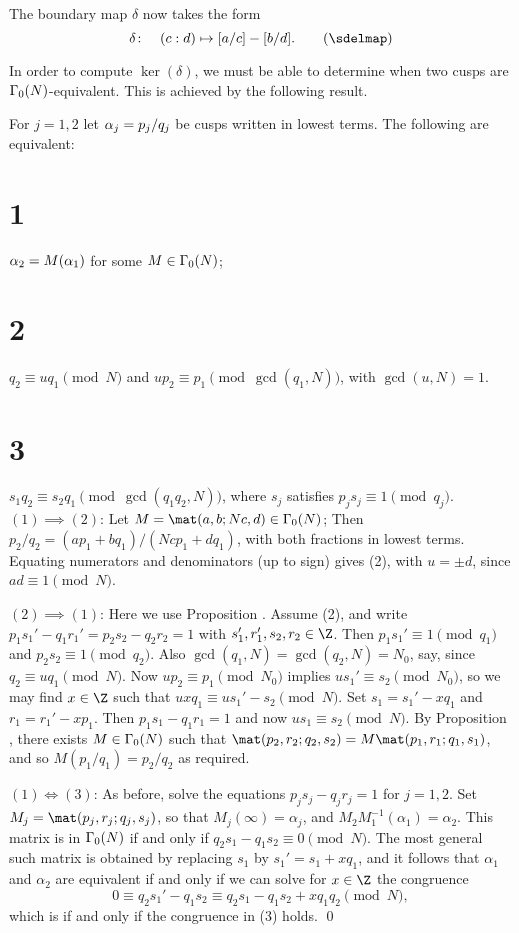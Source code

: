The boundary map $\delta$ now takes the form \neweq{\sdelmap}
$$
   \delta\colon\quad (c:d) \mapsto [a/c] - [b/d].          \tag \sdelmap
$$

In order to compute $\ker(\delta)$, we must be able to determine when two cusps
are $\G0(N)$-equivalent.  This is achieved by the following result.

\newprop{\Cuspeq}\def\a{\alpha}
For $j=1,2$ let $\a_j=p_j/q_j$ be cusps written in 
lowest terms.  The following are equivalent:
\part{1} $\a_2=M(\a_1)$ for some $M\in\G0(N)$;
\part{2} $q_2\equiv u q_1\pmod{N}$ and $up_2\equiv p_1\pmod{\gcd(q_1,N)}$, 
with $\gcd(u,N)=1$.
\part{3} $s_1q_2\equiv s_2q_1 \pmod{\gcd(q_1q_2,N)}$, where $s_j$ satisfies 
$p_js_j\equiv1\pmod{q_j}$.
\endproclaim
{} $(1) \implies (2)$:
Let $M=\mat(a,b;Nc,d)\in\G0(N)$;   Then $p_2/q_2=(ap_1+bq_1)/(Ncp_1+dq_1)$,
with both fractions in lowest terms.  Equating numerators and denominators 
(up to sign) gives (2), with $u=\pm d$, since $ad\equiv1\pmod{N}$.

$(2) \implies (1)$:
Here we use Proposition \Cosets.   Assume (2), and write 
$p_1s_1'-q_1r_1'=p_2s_2-q_2r_2=1$ with $s_1',r_1',s_2,r_2\in\Z$.
Then $p_1s_1'\equiv1\pmod{q_1}$ and $p_2s_2\equiv1\pmod{q_2}$.  Also
$\gcd(q_1,N)=\gcd(q_2,N)=N_0$, say, since $q_2\equiv u q_1\pmod{N}$.   
Now $up_2\equiv p_1\pmod{N_0}$ implies $us_1'\equiv s_2\pmod{N_0}$, 
so we may find $x\in\Z$ such that $uxq_1\equiv us_1'- s_2\pmod{N}$.
Set $s_1=s_1'-xq_1$ and $r_1=r_1'-xp_1$.   Then $p_1s_1-q_1r_1=1$ and now
$us_1\equiv s_2\pmod{N}$.   By Proposition \Cosets, there exists $M\in\G0(N)$ 
such that $\mat(p_2,r_2;q_2,s_2)=M\mat(p_1,r_1;q_1,s_1)$, and so 
$M(p_1/q_1)=p_2/q_2$ as required.

$(1) \iff (3)$: As before, solve the equations $p_js_j-q_jr_j=1$ for
$j=1,2$.  Set $M_j=\mat(p_j,r_j;q_j,s_j)$, so that
$M_j(\infty)=\alpha_j$, and $M_2M_1^{-1}(\alpha_1) =\alpha_2$.  This
matrix is in $\G0(N)$ if and only if $q_2s_1-q_1s_2
\equiv0\pmod{N}$.  The most general such matrix is obtained by
replacing $s_1$ by $s_1'=s_1+xq_1$, and it follows that $\alpha_1$ and
$\alpha_2$ are equivalent if and only if we can solve for $x\in\Z$ the
congruence
$$
  0 \equiv q_2s_1'-q_1s_2 \equiv q_2s_1-q_1s_2+xq_1q_2 \pmod{N},
$$
which is if and only if the congruence in (3) holds.
\qed
\enddemo

